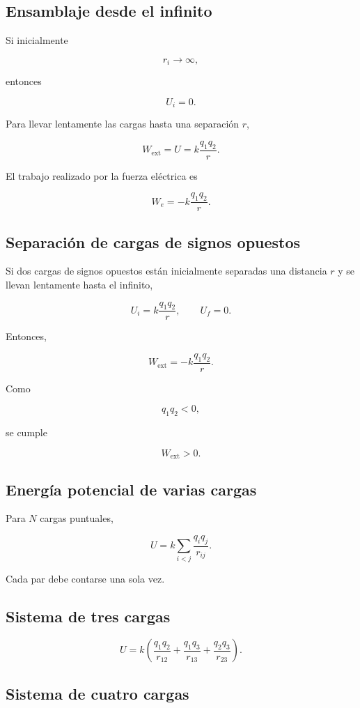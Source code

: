 \subsection{Ensamblaje desde el infinito}

Si inicialmente

\[
r_i\to\infty,
\]

entonces

\[
U_i=0.
\]

Para llevar lentamente las cargas hasta una separación \(r\),

\[
\boxed{
W_{\text{ext}}
=
U
=
k\frac{q_1q_2}{r}
}.
\]

El trabajo realizado por la fuerza eléctrica es

\[
\boxed{
W_e
=
-k\frac{q_1q_2}{r}
}.
\]


\subsection{Separación de cargas de signos opuestos}

Si dos cargas de signos opuestos están inicialmente separadas una distancia \(r\)
y se llevan lentamente hasta el infinito,

\[
U_i=k\frac{q_1q_2}{r},
\qquad
U_f=0.
\]

Entonces,

\[
\boxed{
W_{\text{ext}}
=
-k\frac{q_1q_2}{r}
}.
\]

Como

\[
q_1q_2<0,
\]

se cumple

\[
W_{\text{ext}}>0.
\]


\subsection{Energía potencial de varias cargas}

Para \(N\) cargas puntuales,

\[
\boxed{
U
=
k\sum_{i<j}
\frac{q_iq_j}{r_{ij}}
}.
\]

Cada par debe contarse una sola vez.


\subsection{Sistema de tres cargas}

\[
\boxed{
U
=
k
\left(
\frac{q_1q_2}{r_{12}}
+
\frac{q_1q_3}{r_{13}}
+
\frac{q_2q_3}{r_{23}}
\right)
}.
\]


\subsection{Sistema de cuatro cargas}

